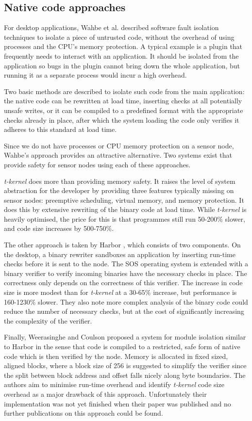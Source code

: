 \subsection{Native code approaches}
For desktop applications, Wahbe et al. described software fault isolation \cite{Wahbe:1994cj} techniques to isolate a piece of untrusted code, without the overhead of using processes and the CPU's memory protection. A typical example is a plugin that frequently needs to interact with an application. It should be isolated from the application so bugs in the plugin cannot bring down the whole application, but running it as a separate process would incur a high overhead.

Two basic methods are described to isolate such code from the main application: the native code can be rewritten at load time, inserting checks at all potentially unsafe writes, or it can be compiled to a predefined format with the appropriate checks already in place, after which the system loading the code only verifies it adheres to this standard at load time.

Since we do not have processes or CPU memory protection on a sensor node, Wahbe's approach provides an attractive alternative. Two systems exist that provide safety for sensor nodes using each of these approaches.

\emph{t-kernel} \cite{Gu:2006ww} does more than providing memory safety. It raises the level of system abstraction for the developer by providing three features typically missing on sensor nodes: preemptive scheduling, virtual memory, and memory protection. It does this by extensive rewriting of the binary code at load time. While \emph{t-kernel} is heavily optimised, the price for this is that programmes still run 50-200\% slower, and code size increases by 500-750\%.

The other approach is taken by Harbor \cite{Kumar:2007ge}, which consists of two components. On the desktop, a binary rewriter sandboxes an application by inserting run-time checks before it is sent to the node. The SOS operating system \cite{Han:2005th} is extended with a binary verifier to verify incoming binaries have the necessary checks in place. The correctness only depends on the correctness of this verifier. The increase in code size is more modest than for \emph{t-kernel} at a 30-65\% increase, but performance is 160-1230\% slower. They also note more complex analysis of the binary code could reduce the number of necessary checks, but at the cost of significantly increasing the complexity of the verifier.

Finally, Weerasinghe and Coulson \cite{Weerasinghe:2008kh} proposed a system for module isolation similar to Harbor in the sense that code is compiled to a restricted, safe form of native code which is then verified by the node. Memory is allocated in fixed sized, aligned blocks, where a block size of 256 is suggested to simplify the verifier since the split between block address and offset falls nicely along byte boundaries. The authors aim to minimise run-time overhead and identify \emph{t-kernel} code size overhead as a major drawback of this approach. Unfortunately their implementation was not yet finished when their paper was published and no further publications on this approach could be found.
